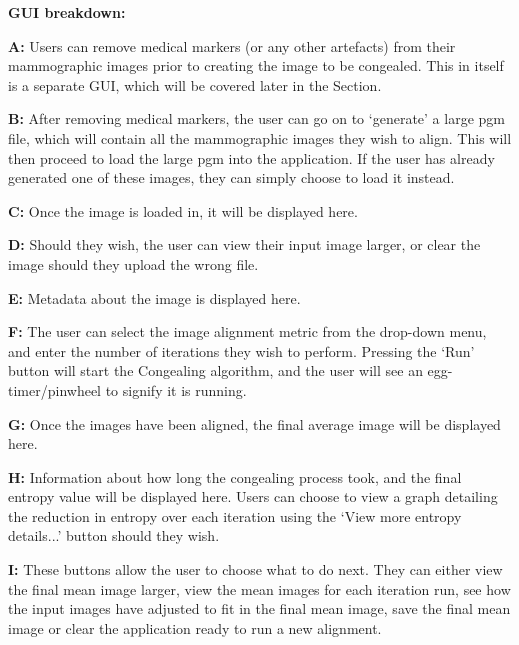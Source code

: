 \vspace{2cm}

\noindent \textbf{\acrshort{GUI} breakdown: }

\noindent \textbf{ A: } Users can remove medical markers (or any other artefacts) from their mammographic images prior to creating the image to be congealed. This in itself is a separate \acrshort{GUI}, which will be covered later in the Section.

\noindent \textbf{ B: } After removing medical markers, the user can go on to `generate' a large pgm file, which will contain all the mammographic images they wish to align. This will then proceed to load the large pgm into the application. If the user has already generated one of these images, they can simply choose to load it instead.

\noindent \textbf{ C: } Once the image is loaded in, it will be displayed here.

\noindent \textbf{ D: } Should they wish, the user can view their input image larger, or clear the image should they upload the wrong file.

\noindent \textbf{ E: } Metadata about the image is displayed here.

\noindent \textbf{ F: } The user can select the image alignment metric from the drop-down menu, and enter the number of iterations they wish to perform. Pressing the `Run' button will start the \Gls{Congealing} algorithm, and the user will see an egg-timer/pinwheel to signify it is running.

\noindent \textbf{ G: } Once the images have been aligned, the final average image will be displayed here.

\noindent \textbf{ H: } Information about how long the congealing process took, and the final entropy value will be displayed here. Users can choose to view a graph detailing the reduction in entropy over each iteration using the `View more entropy details...' button should they wish.

\noindent \textbf{ I: } These buttons allow the user to choose what to do next. They can either view the final mean image larger, view the mean images for each iteration run, see how the input images have adjusted to fit in the final mean image, save the final mean image or clear the application ready to run a new alignment.


